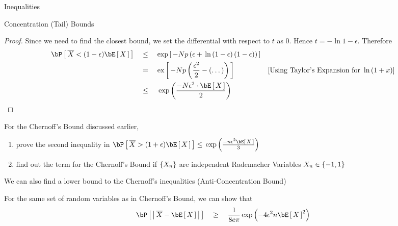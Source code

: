 \documentclass{article}
\begin{document}
\begin{ssection}{Inequalities}
\begin{ssubsection}{Concentration (Tail) Bounds}
\begin{enumerate}[label=\bt{\theenumi.}]
\begin{proof}
					Since we need to find the closest bound, we set the differential with respect to $t$ as 0. Hence $t = - \ln{1 - \epsilon}$. Therefore
					\begin{align*}
						\prob{\compl{X} < (1 - \epsilon) \E{X}}	&\qle	\text{exp}\brac{-Np \para{\epsilon + \ln{1 - \epsilon} (1 - \epsilon)}} \\
																&\eq	\text{ex}\brac{-Np \para{\frac{\epsilon^2}{2} - (\dots)}} \mcmnt{Using Taylor's Expansion for $\ln{1 + x}$} \\
																&\qle	\texp{\frac{-N \epsilon^2 \cdot \E{X}}{2}}
					\end{align*}
                    \endgroup{}
				\end{proof}

		\end{enumerate}

		\begin{exercise}
			For the Chernoff's Bound discussed earlier,
			\begin{enumerate}[label=(\roman*)]
				\item prove the second inequality in  $\prob{\compl{X} > (1 + \epsilon) \E{X}} \le \texp{\frac{-n \epsilon^2 \E{X}}{3}}$
				\item find out the term for the Chernoff's Bound if $\left\{ {X_n} \right\}$ are independent Rademacher Variables \ie $X_n \in \left\{ {-1, 1} \right\}$
			\end{enumerate}
		\end{exercise}

	\end{ssubsection}

	We can also find a lower bound to the Chernoff's inequalities (Anti-Concentration Bound)

	\begin{theorem}
		For the same set of random variables as in Chernoff's Bound, we can show that
		\begin{align*}
			\prob{\abs{\compl{X} - \E{X}}}	\qge	\frac{1}{8e\pi} \texp{-4 \epsilon^2 n \E{X}^2}
		\end{align*}
	\end{theorem}

\end{ssection}
\end{document}
